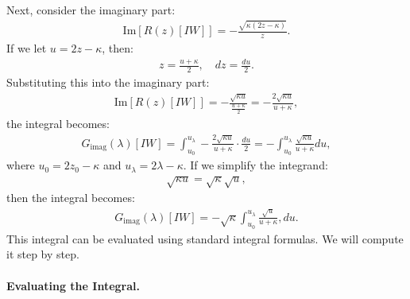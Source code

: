 Next, consider the imaginary part:
\begin{align}
\text{Im}[R(z)[IW]] = - \frac{ \sqrt{ \kappa(2z - \kappa) } }{ z }.
\end{align}
%
If we let $u = 2z - \kappa$, then:
\begin{align}
z = \frac{u + \kappa}{2}, \quad dz = \frac{du}{2}.
\end{align}
%
Substituting this into the imaginary part:
\begin{align}
\text{Im}[R(z)[IW]] = - \frac{ \sqrt{ \kappa u } }{ \frac{u + \kappa}{2} } = - \frac{ 2 \sqrt{ \kappa u } }{ u + \kappa } ,
\end{align}
the integral becomes:
\begin{align}
G_{\text{imag}}(\lambda)[IW] 
   = \int_{u_0}^{u_\lambda} - \frac{ 2 \sqrt{ \kappa u } }{ u + \kappa } \cdot \frac{du}{2}  
   = - \int_{u_0}^{u_\lambda} \frac{ \sqrt{ \kappa u } }{ u + \kappa } du  ,
\end{align}
where $u_0 = 2 z_0 - \kappa$ and $u_\lambda = 2 \lambda - \kappa$.
%
If we simplify the integrand:
\begin{align}
\sqrt{ \kappa u } = \sqrt{ \kappa } \sqrt{ u }, 
\end{align}
%
then the integral becomes:
\begin{align}
G_{\text{imag}}(\lambda)[IW] = - \sqrt{ \kappa } \int_{u_0}^{u_\lambda} \frac{ \sqrt{ u } }{ u + \kappa } , du.
\end{align}
%
This integral can be evaluated using standard integral formulas. 
We will compute it step by step.


\paragraph{Evaluating the Integral.}

